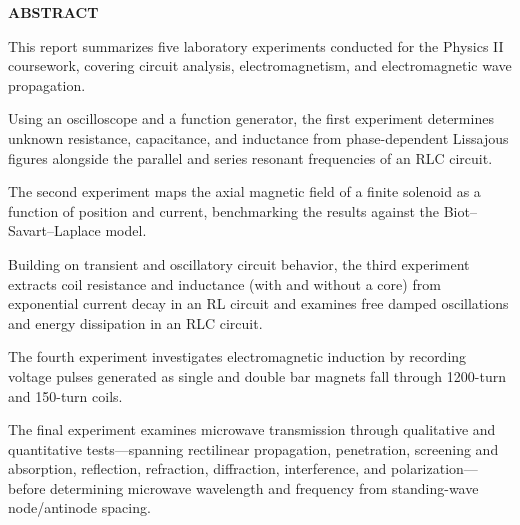 \documentclass[12pt,twoside,a4paper]{article}
\makeatletter
\theoremstyle{definition}
\def\cleardoublepage{\clearpage\if@twoside\ifodd\c@page\else
  \hbox{}\thispagestyle{empty}\newpage
  \if@twocolumn\hbox{}\newpage\fi\fi\fi}
\makeatother
\begin{document}
\thispagestyle{empty}
\mbox{}

\cleardoublepage
{}
\begin{center}
	\text{}
	
	\textbf{\Large ABSTRACT}
\end{center}
\vspace{0.5cm}

\noindent
This report summarizes five laboratory experiments conducted for the Physics II coursework, covering circuit analysis, electromagnetism, and electromagnetic wave propagation. 

\vspace{0.35cm}
\noindent
Using an oscilloscope and a function generator, the first experiment determines unknown resistance, capacitance, and inductance from phase-dependent Lissajous figures alongside the parallel and series resonant frequencies of an RLC circuit. 

\vspace{0.35cm}
\noindent
The second experiment maps the axial magnetic field of a finite solenoid as a function of position and current, benchmarking the results against the Biot--Savart--Laplace model. 

\vspace{0.35cm}
\noindent
Building on transient and oscillatory circuit behavior, the third experiment extracts coil resistance and inductance (with and without a core) from exponential current decay in an RL circuit and examines free damped oscillations and energy dissipation in an RLC circuit. 

\vspace{0.35cm}
\noindent
The fourth experiment investigates electromagnetic induction by recording voltage pulses generated as single and double bar magnets fall through 1200-turn and 150-turn coils.

\vspace{0.35cm}
\noindent
The final experiment examines microwave transmission through qualitative and quantitative tests—spanning rectilinear propagation, penetration, screening and absorption, reflection, refraction, diffraction, interference, and polarization—before determining microwave wavelength and frequency from standing-wave node/antinode spacing. 
\end{document}
